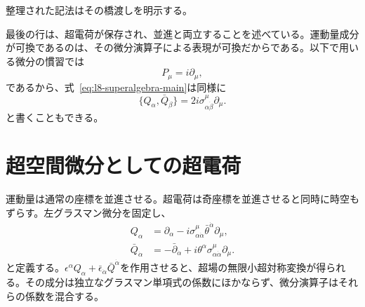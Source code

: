 \begin{classroomqa}
\end{classroomqa}

整理された記法はその橋渡しを明示する。

最後の行は、超電荷が保存され、並進と両立することを述べている。運動量成分が可換であるのは、その微分演算子による表現が可換だからである。以下で用いる微分の慣習では
\begin{equation}
P_\mu=i\partial_\mu,
\end{equation}
であるから、式~\eqref{eq:l8-superalgebra-main}は同様に
\begin{equation}
\{Q_\alpha,\bar Q_{\dot\beta}\}
=2i\sigma^\mu_{\alpha\dot\beta}\partial_\mu.
\end{equation}
と書くこともできる。

\section{超空間微分としての超電荷}

運動量は通常の座標を並進させる。超電荷は奇座標を並進させると同時に時空もずらす。左グラスマン微分を固定し、
\begin{align}
Q_\alpha
&=\partial_\alpha
-i\sigma^\mu_{\alpha\dot\alpha}
\bar\theta^{\dot\alpha}\partial_\mu,
\label{eq:l8-Q}\\
\bar Q_{\dot\alpha}
&=-\bar\partial_{\dot\alpha}
+i\theta^\alpha\sigma^\mu_{\alpha\dot\alpha}\partial_\mu.
\label{eq:l8-Qbar}
\end{align}
と定義する。\(\epsilon^\alpha Q_\alpha+
\bar\epsilon_{\dot\alpha}\bar Q^{\dot\alpha}\)を作用させると、超場の無限小超対称変換が得られる。その成分は独立なグラスマン単項式の係数にほかならず、微分演算子はそれらの係数を混合する。

\begin{classroomqa}
\end{classroomqa}

